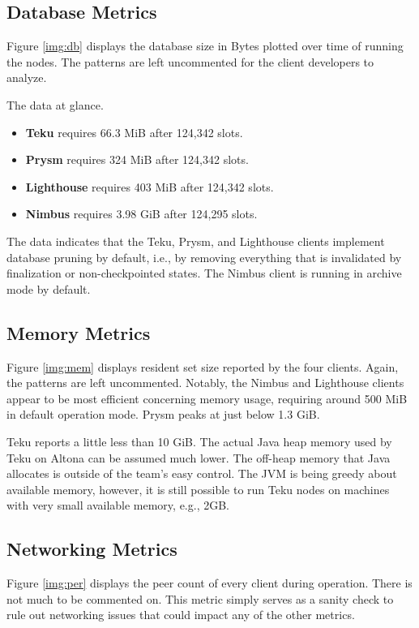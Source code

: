 \documentclass[twoside,twocolumn]{article}
\begin{document}
\subsection{Database Metrics}
Figure \ref{img:db} displays the database size in Bytes plotted over time of running the nodes. The patterns are left uncommented for the client developers to analyze.\par

The data at glance.
\begin{itemize}
\item \textbf{Teku} requires 66.3 MiB after 124,342 slots.
\item \textbf{Prysm} requires 324 MiB after 124,342 slots.
\item \textbf{Lighthouse} requires 403 MiB after 124,342 slots.
\item \textbf{Nimbus} requires 3.98 GiB after 124,295 slots.
\end{itemize}

The data indicates that the Teku, Prysm, and Lighthouse clients implement database pruning by default, i.e., by removing everything that is invalidated by finalization or non-checkpointed states. The Nimbus client is running in archive mode by default.\par

\subsection{Memory Metrics}
Figure \ref{img:mem} displays resident set size reported by the four clients. Again, the patterns are left uncommented. Notably, the Nimbus and Lighthouse clients appear to be most efficient concerning memory usage, requiring around 500 MiB in default operation mode. Prysm peaks at just below 1.3 GiB.\par

Teku reports a little less than 10 GiB. The actual Java heap memory used by Teku on Altona can be assumed much lower. The off-heap memory that Java allocates is outside of the team's easy control. The JVM is being greedy about available memory, however, it is still possible to run Teku nodes on machines with very small available memory, e.g., 2GB.\par

\subsection{Networking Metrics}
\label{sec:perf:p2p}
Figure \ref{img:per} displays the peer count of every client during operation. There is not much to be commented on. This metric simply serves as a sanity check to rule out networking issues that could impact any of the other metrics.\par
\end{document}
